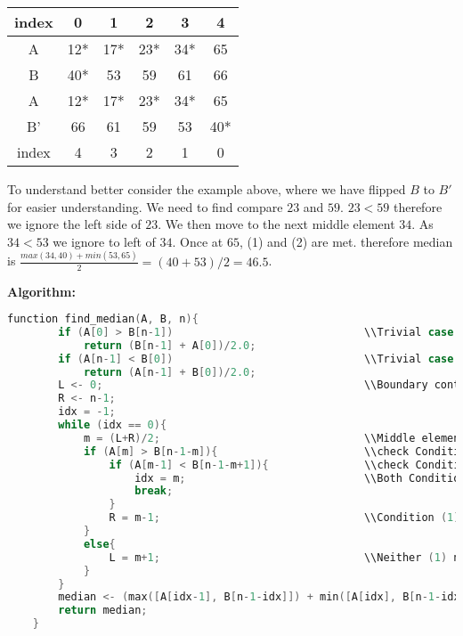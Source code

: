 \documentclass[10pt, a4paper]{article}
\begin{document}
\begin{center}
    \begin{tabular}{ |c||c|c|c|c|c| }
     \hline
     index & 0 & 1 & 2 & 3 & 4\\
     \hline
     A& 12* & 17* & 23* & 34* & 65\\
     \hline
     B& 40* & 53 & 59 & 61 & 66\\
     \hline
     \hline
     A& 12* & 17* & 23* & 34* & 65\\
     \hline
     B'& 66 & 61 & 59 & 53 & 40*\\
     \hline
     index & 4 & 3 & 2 & 1 & 0\\
     \hline
    \end{tabular}
\end{center}

To understand better consider the example above, where we have flipped $B$ to $B'$ for easier understanding. We need to find compare $23$ and $59$. $23 < 59$ therefore we ignore the left side of $23$. We then move to the next middle element $34$. As $34<53$ we ignore to left of $34$. Once at $65$, (1) and (2) are met. therefore median is $\frac{max(34, 40) + min(53,65)}{2}=(40+53)/2 = 46.5$.

\vspace{10px}
\normalsize
\noindent\textbf{Algorithm:}
\begin{lstlisting}[language=C++,caption=Find median]
    function find_median(A, B, n){
        if (A[0] > B[n-1])                              \\Trivial case
            return (B[n-1] + A[0])/2.0;
        if (A[n-1] < B[0])                              \\Trivial case
            return (A[n-1] + B[0])/2.0;
        L <- 0;                                         \\Boundary control
        R <- n-1;
        idx = -1;
        while (idx == 0){
            m = (L+R)/2;                                \\Middle element
            if (A[m] > B[n-1-m]){                       \\check Condition (1)
                if (A[m-1] < B[n-1-m+1]){               \\check Condition (2)
                    idx = m;                            \\Both Condition (1) and (2) true
                    break;
                }
                R = m-1;                                \\Condition (1) but not (2)
            }
            else{
                L = m+1;                                \\Neither (1) nor (2)
            }
        }
        median <- (max([A[idx-1], B[n-1-idx]]) + min([A[idx], B[n-1-idx+1]))/2;
        return median;
    }
\end{lstlisting}
\end{document}
